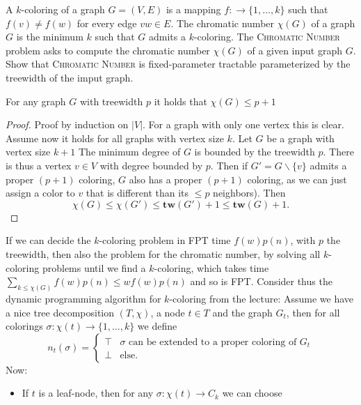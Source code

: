 \documentclass{article}
\begin{document}
\begin{exercise}
    A $k$-coloring of a graph $G= (V,E)$ is a mapping $f:\to \{1,\dots, k\}$ such that $f(v)\neq f(w)$ for every edge $vw\in E$. The chromatic number $\chi(G)$ of a graph $G$ is the minimum $k$ such that $G$ admits a $k$-coloring. The \textsc{Chromatic Number} problem asks to compute the chromatic number $\chi(G)$ of a given input graph $G$. Show that \textsc{Chromatic Number} is fixed-parameter tractable parameterized by the treewidth of the imput graph.
\end{exercise}
\begin{solving}
\begin{lemma}
    For any graph $G$ with treewidth $p$ it holds that $\chi(G)\leq p+1$
\end{lemma}
\begin{proof}
Proof by induction on $|V|$. For a graph with only one vertex this is clear. Assume now it holds for all graphs with vertex size $k$. Let $G$ be a graph with vertex size $k+1$
    The minimum degree of $G$ is bounded by the treewidth $p$. There is thus a vertex $v\in V$ with degree bounded by $p$. Then if $G' = G\backslash \{v\}$  admits a proper $(p+1)$ coloring, $G$ also has a proper $(p+1)$ coloring, as we can just assign a color to $v$ that is different than its $\leq p$ neighbors). Then $$\chi(G)\leq \chi(G') \leq \mathbf{tw}(G')+1 \leq \mathbf{tw}(G)+1.$$
\end{proof}
    If we can decide the $k$-coloring problem in FPT time $f(w)p(n)$, with $p$ the treewidth, then also the problem for the chromatic number, by solving all $k$-coloring problems until we find a $k$-coloring, which takes time $\sum_{k\leq \chi(G)}f(w) p(n) \leq wf(w) p(n)$ and so is FPT. Consider thus the dynamic programming algorithm for $k$-coloring from the lecture: Assume we have a nice tree decomposition $(T, \chi)$, a node $t\in T$ and the graph $G_t$, then for all colorings $\sigma: \chi(t)\to \{1, \dots, k\}$ we define \begin{equation*}
        n_t(\sigma) = \begin{cases}
            \top & \sigma \text{ can be extended to a proper coloring of }G_t\\
            \bot& \text{else}.
        \end{cases}
    \end{equation*}
  Now: \begin{itemize}
      \item If $t$ is a leaf-node, then for any $\sigma: \chi(t)\to C_k$ we can choose \begin{equation*}

\end{equation*}
\end{itemize}
\end{solving}
\end{document}
